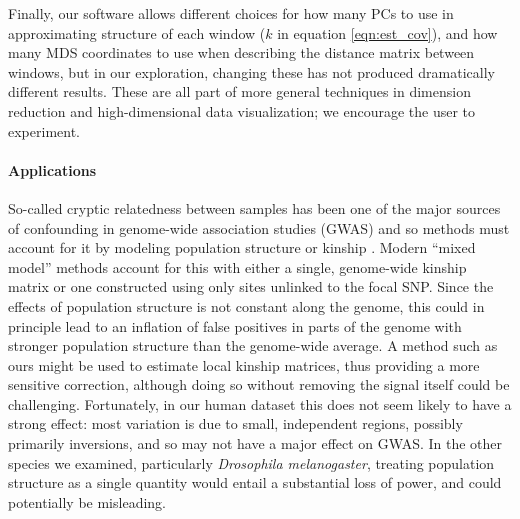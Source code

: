 \documentclass[11pt, oneside]{article}   	%
\newcommand\citep{\cite}
\renewcommand{\revpoint}[2]{\relax}
\begin{document}

Finally, our software allows different choices for how many PCs to use in approximating structure of each window ($k$ in equation \ref{eqn:est_cov}),
and how many MDS coordinates to use when describing the distance matrix between windows,
but in our exploration, changing these has not produced dramatically different results.
These are all part of more general techniques in dimension reduction and high-dimensional data visualization;
we encourage the user to experiment.



\paragraph{Applications}
So-called cryptic relatedness between samples
has been one of the major sources of confounding in genome-wide association studies (GWAS)
and so methods must account for it by modeling population structure or kinship \citep{astle2009population,yang2014advantages}.
Modern ``mixed model'' methods \citep[e.g.][]{loh2015efficient} 
account for this with either a single, genome-wide kinship matrix
or one constructed using only sites unlinked to the focal SNP. \revpoint{2}{9}   %
Since the effects of population structure is not constant along the genome,
this could in principle lead to an inflation of false positives in parts of the genome
with stronger population structure than the genome-wide average.
A method such as ours might be used to estimate local kinship matrices,
thus providing a more sensitive correction,
although doing so without removing the signal itself could be challenging.
Fortunately, in our human dataset this does not seem likely to have a strong effect:
most variation is due to small, independent regions, possibly primarily inversions,
and so may not have a major effect on GWAS.
In the other species we examined, particularly \textit{Drosophila melanogaster},
treating population structure as a single quantity would entail a substantial loss of power,
and could potentially be misleading.
\end{document}
